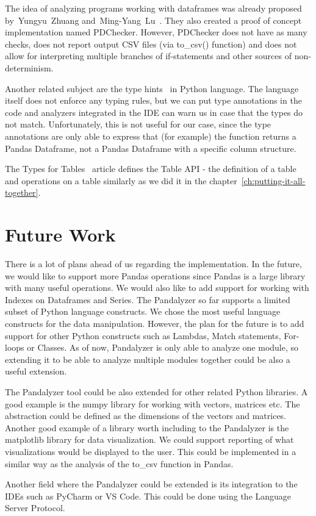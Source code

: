 The idea of analyzing programs working with dataframes was already proposed by~Yungyu~Zhuang
and~Ming-Yang~Lu~\cite{Zhuang:2022:TypeChecking}.
They also created a proof of concept implementation named PDChecker.
However, PDChecker does not have as many checks, does not report output CSV files (via to\_csv() function) and
does not allow for interpreting multiple branches of if-statements and other sources of non-determinism.

Another related subject are the type hints~\cite{python_typing} in Python language.
The language itself does not enforce any typing rules, but we can put type annotations in the code and analyzers
integrated in the IDE can warn us in case that the types do not match.
Unfortunately, this is not useful for our case, since the type annotations are only able to express that
(for example) the function returns a Pandas Dataframe, not a Pandas Dataframe with a specific column structure.

The Types for Tables~\cite{types_for_tables} article defines the Table API - the definition of a table and operations on
a table similarly as we did it in the chapter~\ref{ch:putting-it-all-together}.


\section*{Future Work}\label{sec:future-work}

There is a lot of plans ahead of us regarding the implementation.
In the future, we would like to support more Pandas operations since Pandas is a large library with many useful
operations.
We would also like to add support for working with Indexes on Dataframes and Series.
The Pandalyzer so far supports a limited subset of Python language constructs.
We chose the most useful language constructs for the data manipulation.
However, the plan for the future is to add support for other Python constructs such as Lambdas, Match statements,
For-loops or Classes.
As of now, Pandalyzer is only able to analyze one module, so extending it to be able to analyze multiple modules together
could be also a useful extension.

The Pandalyzer tool could be also extended for other related Python libraries.
A good example is the numpy library for working with vectors, matrices etc.
The abstraction could be defined as the dimensions of the vectors and matrices.
Another good example of a library worth including to the Pandalyzer is the matplotlib library for data visualization.
We could support reporting of what visualizations would be displayed to the user.
This could be implemented in a similar way as the analysis of the to\_csv function in Pandas.

Another field where the Pandalyzer could be extended is its integration to the IDEs such as PyCharm or VS Code.
This could be done using the Language Server Protocol.